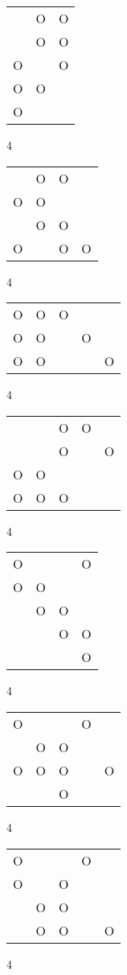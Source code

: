 \begin{tabular}{|m{0.2cm}m{0.2cm}m{0.2cm}|}\hline
 &O&O\\
 &O&O\\
O& &O\\
O&O& \\
O& & \\
\hline\end{tabular}4
\begin{tabular}{|m{0.2cm}m{0.2cm}m{0.2cm}m{0.2cm}|}\hline
 &O&O& \\
O&O& & \\
 &O&O& \\
O& &O&O\\
\hline\end{tabular}4
\begin{tabular}{|m{0.2cm}m{0.2cm}m{0.2cm}m{0.2cm}m{0.2cm}|}\hline
O&O&O& & \\
O&O& &O& \\
O&O& & &O\\
\hline\end{tabular}4
\begin{tabular}{|m{0.2cm}m{0.2cm}m{0.2cm}m{0.2cm}m{0.2cm}|}\hline
 & &O&O& \\
 & &O& &O\\
O&O& & & \\
O&O&O& & \\
\hline\end{tabular}4
\begin{tabular}{|m{0.2cm}m{0.2cm}m{0.2cm}m{0.2cm}|}\hline
O& & &O\\
O&O& & \\
 &O&O& \\
 & &O&O\\
 & & &O\\
\hline\end{tabular}4
\begin{tabular}{|m{0.2cm}m{0.2cm}m{0.2cm}m{0.2cm}m{0.2cm}|}\hline
O& & &O& \\
 &O&O& & \\
O&O&O& &O\\
 & &O& & \\
\hline\end{tabular}4
\begin{tabular}{|m{0.2cm}m{0.2cm}m{0.2cm}m{0.2cm}m{0.2cm}|}\hline
O& & &O& \\
O& &O& & \\
 &O&O& & \\
 &O&O& &O\\
\hline\end{tabular}4
